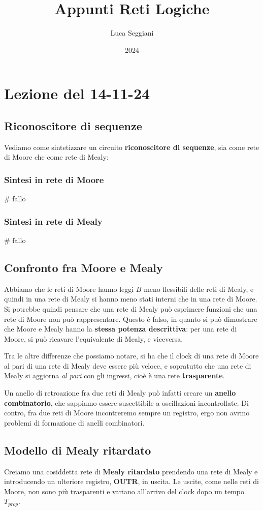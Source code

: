 \documentclass[a4paper,11pt]{article}
\title{Appunti Reti Logiche}
\author{Luca Seggiani}
\date{2024}
\begin{document}
\section{Lezione del 14-11-24}

\thispagestyle{empty}
\pagestyle{fancy}

\subsection{Riconoscitore di sequenze}
Vediamo come sintetizzare un circuito \textbf{riconoscitore di sequenze}, sia come rete di Moore che come rete di Mealy:

\subsubsection{Sintesi in rete di Moore}
# fallo

\subsubsection{Sintesi in rete di Mealy}
# fallo

\subsection{Confronto fra Moore e Mealy}
Abbiamo che le reti di Moore hanno leggi $B$ meno flessibili delle reti di Mealy, e quindi in una rete di Mealy si hanno meno stati interni che in una rete di Moore.
Si potrebbe quindi pensare che una rete di Mealy può esprimere funzioni che una rete di Moore non può rappresentare.
Questo è falso, in quanto si può dimostrare che Moore e Mealy hanno la \textbf{stessa potenza descrittiva}: per una rete di Moore, si può ricavare l'equivalente di Mealy, e viceversa.

Tra le altre differenze che possiamo notare, si ha che il clock di una rete di Moore al pari di una rete di Mealy deve essere più veloce, e sopratutto che una rete di Mealy si aggiorna \textit{al pari} con gli ingressi, cioè è una rete \textbf{trasparente}.

Un anello di retroazione fra due reti di Mealy può infatti creare un \textbf{anello combinatorio}, che sappiamo essere suscettibile a oscillazioni incontrollate.
Di contro, fra due reti di Moore incontreremo sempre un registro, ergo non avrmo problemi di formazione di anelli combinatori.

\subsection{Modello di Mealy ritardato}
Creiamo una cosiddetta rete di \textbf{Mealy ritardato} prendendo una rete di Mealy e introducendo un ulteriore registro, \textbf{OUTR}, in uscita.
Le uscite, come nelle reti di Moore, non sono più trasparenti e variano all'arrivo del clock dopo un tempo $T_{prop}$.
\end{document}
